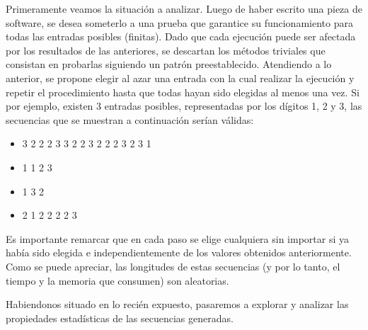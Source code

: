 \documentclass{article}
\begin{document}
	Primeramente veamos la situación a analizar. Luego de haber escrito una pieza de software, se desea someterlo a una prueba que garantice su funcionamiento para todas las entradas posibles (finitas). Dado que cada ejecución puede ser afectada por los resultados de las anteriores, se descartan los métodos triviales que consistan en probarlas siguiendo un patrón preestablecido.
	Atendiendo a lo anterior, se propone elegir al azar una entrada con la cual realizar la ejecución y repetir el procedimiento hasta que todas hayan sido elegidas al menos una vez. Si por ejemplo, existen 3 entradas posibles, representadas por los dígitos 1, 2 y 3, las secuencias que se muestran a continuación serían válidas:

\begin{itemize}
\itemsep=2pt \topsep=0pt \partopsep=0pt \parskip=0pt \parsep=0pt
	\item 3 2 2 2 3 3 2 2 3 2 2 2 3 2 3 1
	\item 1 1 2 3
	\item 1 3 2
	\item 2 1 2 2 2 2 3
\end{itemize}

	Es importante remarcar que en cada paso se elige cualquiera sin importar si ya había sido elegida e independientemente de los valores obtenidos anteriormente. Como se puede apreciar, las longitudes de estas secuencias (y por lo tanto, el tiempo y la memoria que consumen) son aleatorias.
	\par 
	Habiendonos situado en lo recién expuesto, pasaremos a explorar y analizar las propiedades estadísticas de las secuencias generadas.
\end{document}
